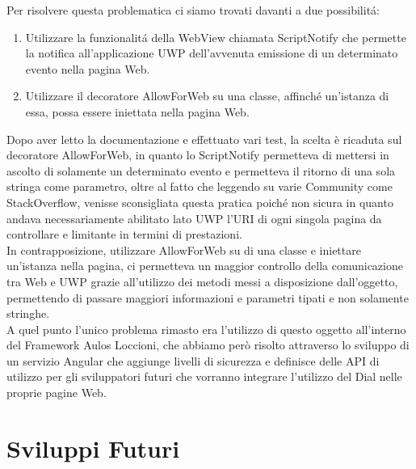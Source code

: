 Per risolvere questa problematica ci siamo trovati davanti a due possibilitá:

\begin{enumerate}
\item Utilizzare la funzionalitá della WebView chiamata ScriptNotify che permette la notifica all'applicazione UWP dell'avvenuta emissione di un determinato evento nella pagina Web.
\item Utilizzare il decoratore AllowForWeb su una classe, affinché un'istanza di essa, possa essere iniettata nella pagina Web.
\end{enumerate}

Dopo aver letto la documentazione e effettuato vari test, la scelta è ricaduta sul decoratore AllowForWeb, in quanto lo ScriptNotify permetteva di mettersi in ascolto di solamente un determinato evento e permetteva il ritorno di una sola stringa come parametro, oltre al fatto che leggendo su varie Community come StackOverflow, venisse sconsigliata questa pratica poiché non sicura in quanto andava necessariamente abilitato lato UWP l'URI di ogni singola pagina da controllare e limitante in termini di prestazioni.\\ 

In contrapposizione, utilizzare AllowForWeb su di una classe e iniettare un'istanza nella pagina, ci permetteva un maggior controllo della comunicazione tra Web e UWP grazie all'utilizzo dei metodi messi a disposizione dall'oggetto, permettendo di passare maggiori informazioni e parametri tipati e non solamente stringhe.\\ 

A quel punto l’unico problema rimasto era l’utilizzo di questo oggetto all’interno del Framework Aulos Loccioni, che abbiamo però risolto attraverso lo sviluppo di un servizio Angular che aggiunge livelli di sicurezza e definisce delle API di utilizzo per gli sviluppatori futuri che vorranno integrare l'utilizzo del Dial nelle proprie pagine Web.


\section{Sviluppi Futuri}

